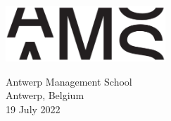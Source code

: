 \begin{titlepage}
\begin{center}
		\vspace{0.8cm}
		
		\includegraphics[width=6cm]{images/ams-logo}
		
		\vspace{0.8cm}
		
		\Large
		Antwerp Management School\\
		Antwerp, Belgium\\
		19 July 2022
	\end{center}
\end{titlepage}